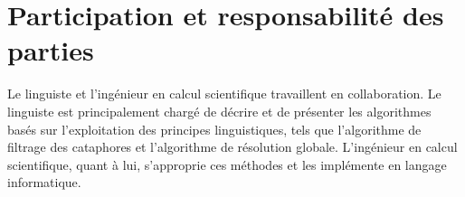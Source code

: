 \documentclass[]{article}
\begin{document}
	\section{Participation et responsabilité des parties}
	Le linguiste et l'ingénieur en calcul scientifique travaillent en collaboration. Le linguiste est principalement chargé de décrire et de présenter les algorithmes basés sur l'exploitation des principes linguistiques, tels que l'algorithme de filtrage des cataphores et l'algorithme de résolution globale. L'ingénieur en calcul scientifique, quant à lui, s'approprie ces méthodes et les implémente en langage informatique.
	
	\begin{comment}
		\newpage
		- Il s'agit d'un problème de TALN (Traitement Automatique du Langage Naturel).
		- Python est le langage approprié pour cette tâche.
		- Techniques de tokenization.
		\newpage
		Exo : Identifier les mots qui suivent les adverbes pronominaux.
	\end{comment}
	
\end{document}
